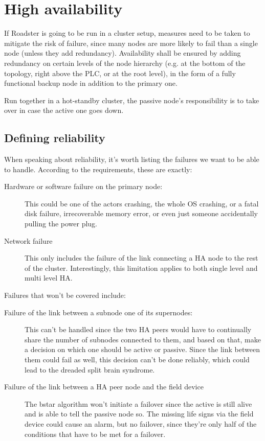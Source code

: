 \section{High availability}\label{sec:approach:ha}
If Roadster is going to be run in a cluster setup, measures need to be taken to
mitigate the risk of failure, since many nodes are more likely to fail than a
single node (unless they add redundancy). Availability shall be ensured by
adding redundancy on certain levels of the node hierarchy (e.g. at the bottom
of the topology, right above the PLC, or at the root level), in the form of a
fully functional backup node in addition to the primary one.

Run together in a hot-standby cluster, the passive node's responsibility is to
take over in case the active one goes down.

\subsection{Defining reliability}
When speaking about reliability, it's worth listing the failures we want to be
able to handle. According to the requirements, these are exactly:

\begin{description}
	\item [Hardware or software failure on the primary node:]
		This could be one of the actors crashing, the whole OS
		crashing, or a fatal disk failure, irrecoverable memory error,
		or even just someone accidentally pulling the power plug.

	\item [Network failure]
		This only includes the failure of the link connecting a HA node
		to the rest of the cluster.  Interestingly, this limitation applies to both
		single level and multi level HA.
\end{description}

Failures that won't be covered include:
\begin{description}
	\item [Failure of the link between a subnode one of its supernodes:]

		This can't be handled since the two HA peers would have to
		continually share the number of subnodes connected to them, and
		based on that, make a decision on which one should be active or
		passive. Since the link between them could fail as well, this
		decision can't be done reliably, which could lead to the
		dreaded split brain syndrome.

	\item [Failure of the link between a HA peer node and the field device]
		The \gls{bstar} algorithm won't initiate a failover since the
		active is still alive and is able to tell the passive node so.
		The missing life signs via the field device could cause an alarm, but no
		failover, since they're only half of the conditions that have
		to be met for a failover.
\end{description}

